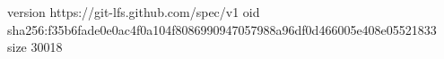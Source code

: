 version https://git-lfs.github.com/spec/v1
oid sha256:f35b6fade0e0ac4f0a104f8086990947057988a96df0d466005e408e05521833
size 30018
